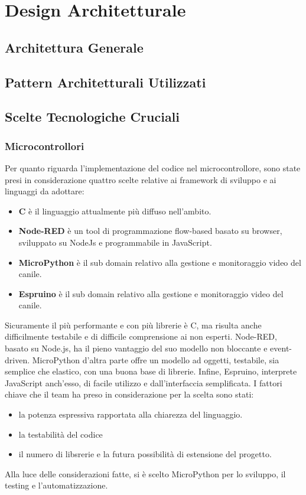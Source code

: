 \chapter{Design Architetturale}
    \section{Architettura Generale}
    \section{Pattern Architetturali Utilizzati}
    \section{Scelte Tecnologiche Cruciali}
        \subsection{Microcontrollori}
        Per quanto riguarda l'implementazione del codice nel microcontrollore, sono state presi in considerazione quattro scelte relative ai framework di sviluppo e ai linguaggi da adottare: 
        \begin{itemize}
            \item \textbf{C} è il linguaggio attualmente più diffuso nell'ambito. 
            
            \item \textbf{Node-RED} è un tool di programmazione flow-based basato su browser, sviluppato su NodeJs e programmabile in JavaScript.
            
            \item \textbf{MicroPython} è il sub domain relativo alla gestione e monitoraggio video del canile.
            
            \item \textbf{Espruino} è il sub domain relativo alla gestione e monitoraggio video del canile.
        \end{itemize}
        Sicuramente il più performante e con più librerie è C, ma risulta anche difficilmente testabile e di difficile comprensione ai non esperti. Node-RED, basato su Node.js, ha il pieno vantaggio del suo modello non bloccante e event-driven. MicroPython d'altra parte offre un modello ad oggetti, testabile, sia semplice che elastico, con una buona base di librerie. Infine, Espruino, interprete JavaScript anch'esso, di facile utilizzo e dall'interfaccia semplificata. 
        I fattori chiave che il team ha preso in considerazione per la scelta sono stati: 
        \begin{itemize}
            \item la potenza espressiva rapportata alla chiarezza del linguaggio. 
            \item la testabilità del codice
            \item il numero di libsrerie e la futura possibilità di estensione del progetto.
        \end{itemize}
        Alla luce delle considerazioni fatte, si è scelto MicroPython per lo sviluppo, il testing e l'automatizzazione.

